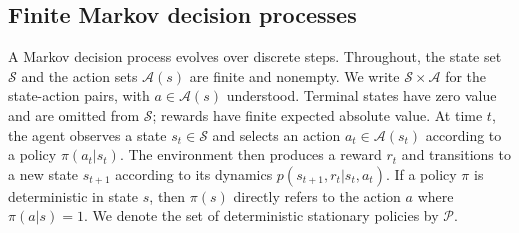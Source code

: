\documentclass[twoside,11pt]{article}
\newcommand{\aset}{\mathcal{A}}
\newcommand{\sset}{\mathcal{S}}
\newcommand{\polset}{\mathcal{P}}
\newcommand{\real}{\mathbb{R}}
\newcommand{\pol}{\pi}
\newcommand{\discount}{\gamma}
\DeclareRobustCommand{\reviewbarstart}{%
  \ifhmode %
    \vadjust{\vbox to 0pt{%
      \vskip-\ht\strutbox %
      \vskip-\dp\strutbox %
      \cbstart[\changebarwidth] %
      \vss %
    }}%
  \else %
    \cbstart[\changebarwidth]%
  \fi %
} %
\providecommand{\DIFadd}[1]{#1} %
\providecommand{\DIFaddbegin}{\reviewbarstart} %
\providecommand{\DIFaddend}{\protect\cbend} %
\def\DIFadd#1{#1}%
\def\DIFaddbegin{}%
\def\DIFaddend{}%
\begin{document}
\subsection{Finite Markov decision processes}


A Markov decision process evolves over discrete steps.
\DIFaddbegin \DIFadd{Throughout, the state set $\sset$ and the action sets $\aset(s)$ are finite and nonempty. We write $\sset\times\aset$ for the state-action pairs, with $a\in\aset(s)$ understood. Terminal states have zero value and are omitted from $\sset$; rewards have finite expected absolute value.
}\DIFaddend %
At time \(t\), the agent observes a state \(s_t \in \mathcal S\) and selects an action \(a_t \in \mathcal A(s_t)\) according to a policy \(\pi(a_t | s_t)\).
The environment then produces a reward \(r_t\) and transitions to a new state \(s_{t+1}\) according to its dynamics $p(s_{t+1}, r_t | s_t, a_t)$.
If a policy $\pol$ is deterministic in state $s$, then $\pol(s)$ directly refers to the action $a$ where $\pol(a | s) = 1$.
We denote the set of deterministic \DIFaddbegin \DIFadd{stationary }\DIFaddend policies by $\polset$.
\end{document}
